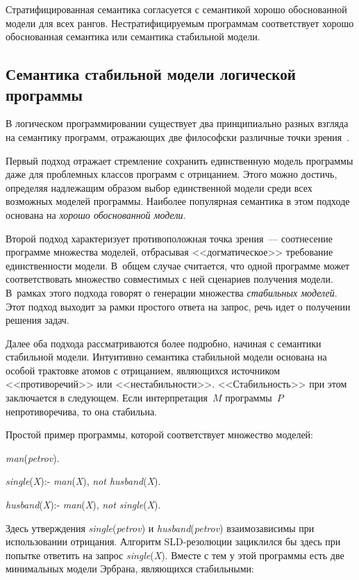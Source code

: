 \begin{multicols}{2}
Стратифицированная семантика согласуется с семантикой хорошо обоснованной модели 
для всех рангов. Нестратифицируемым программам соответствует хорошо обоснованная 
семантика или семантика стабильной модели.
   
   \subsection{Семантика стабильной модели логической программы} %

В логическом программировании существует два принципиально разных взгляда на 
семантику программ, отражающих две философски различные точки зрения~\cite{28kal}.

Первый подход отражает стремление сохранить единственную модель программы даже для 
проб\-лем\-ных классов программ с отрицанием. Этого можно достичь, определяя надлежащим 
образом выбор единственной модели среди всех возможных моделей программы. Наиболее 
популярная семантика в этом подходе основана на \textit{хорошо обосно\-ван\-ной модели}.

Второй подход характеризует противоположная точка зрения~--- соотнесение программе 
множества моделей, отбрасывая <<догматическое>> требование единственности модели. 
В~общем случае считается, что одной программе может соответствовать множество 
совместимых с ней сценариев получения модели. В~рамках этого подхода говорят о 
генерации множества \textit{стабильных моделей}. Этот подход выходит за рамки простого 
ответа на запрос, речь идет о получении решения задач.

Далее оба подхода рассматриваются более подробно, начиная с семантики стабильной 
модели. Интуитивно семантика стабильной модели основана на особой трактовке атомов с 
отрицанием, являющихся источником <<противоречий>> или <<нестабильности>>. 
<<Стабильность>> при этом заключается в следующем. Если интерпретация~$M$ 
программы~$P$ непротиворечива, то она стабильна.

Простой пример программы, которой соответствует множество моделей:

\smallskip

\textit{man}(\textit{petrov}). 

\textit{single}(\textit{X}):\;- \textit{man}(\textit{X}), \textit{not husband}(\textit{X}).

\textit{husband}(\textit{X}):\;- \textit{man}(\textit{X}), \textit{not single}(\textit{X}).

\smallskip

\noindent
Здесь утверждения \textit{single}(\textit{petrov}) и \textit{husband}(\textit{petrov}) 
взаимозависимы при использовании отрицания. Алгоритм SLD-резолюции зациклился бы 
здесь при попытке ответить на запрос \textit{single}(\textit{X}). Вместе с тем у этой 
программы есть две минимальных модели Эрбрана, являющихся стабильными:


\end{multicols}
